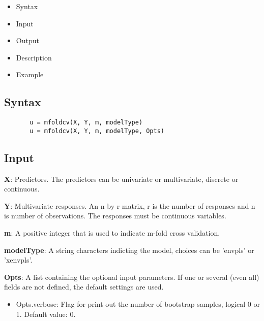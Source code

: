 \documentclass[a4paper,11pt,openany]{memoir}
\begin{document}
\begin{itemize}
\setlength{\itemsep}{-1ex}
   \item Syntax
   \item Input
   \item Output
   \item Description
   \item Example
\end{itemize}


\subsection*{Syntax}


\begin{verbatim}       u = mfoldcv(X, Y, m, modelType)
       u = mfoldcv(X, Y, m, modelType, Opts)\end{verbatim}
    

\subsection*{Input}

\begin{par}
\textbf{X}: Predictors.  The predictors can be univariate or multivariate, discrete or continuous.
\end{par} \vspace{1em}
\begin{par}
\textbf{Y}: Multivariate responses. An n by r matrix, r is the number of responses and n is number of observations. The responses must be continuous variables.
\end{par} \vspace{1em}
\begin{par}
\textbf{m}: A positive integer that is used to indicate m-fold cross validation.
\end{par} \vspace{1em}
\begin{par}
\textbf{modelType}: A string characters indicting the model, choices can be 'envpls' or 'xenvpls'.
\end{par} \vspace{1em}
\begin{par}
\textbf{Opts}: A list containing the optional input parameters. If one or several (even all) fields are not defined, the default settings are used.
\end{par} \vspace{1em}
\begin{itemize}
\setlength{\itemsep}{-1ex}
   \item Opts.verbose: Flag for print out the number of bootstrap samples, logical 0 or 1. Default value: 0.
\end{itemize}
\end{document}
